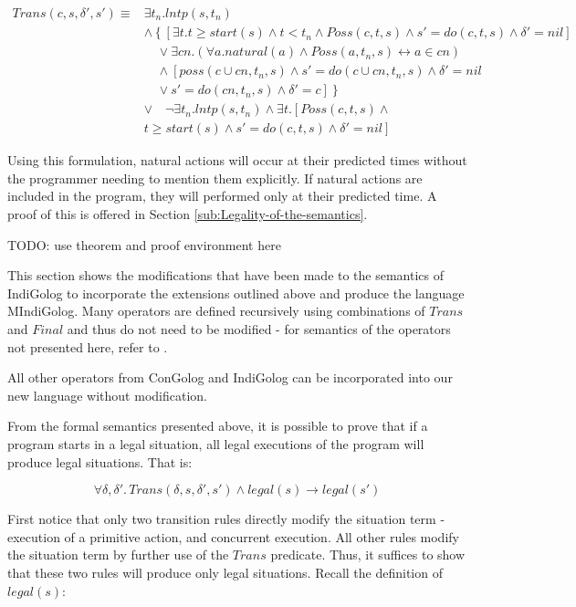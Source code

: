 \documentclass[letterpaper]{article}
\begin{document}
\begin{align*}
Trans(c,s,\delta',s')\equiv & \exists t_{n}. lntp(s,t_{n}) \\
  & \wedge \left\{ \left[\exists t.t\geq start(s)\wedge t<t_{n}\wedge Poss(c,t,s)\wedge s'=do(c,t,s)\wedge\delta'=nil\right]\right.\\
  &  \quad\vee\exists cn.\left(\forall a.natural(a)\wedge Poss(a,t_{n},s)\leftrightarrow a\in cn\right)\\
  & \quad\wedge\left[poss(c\cup cn,t_{n},s)\wedge s'=do(c\cup cn,t_{n},s)\wedge\delta'=nil\right.\\
  & \quad\vee\left.\left.s'=do(cn,t_{n},s)\wedge\delta'=c\right]\right\}\\
  & \vee\quad\neg\exists t_{n}.lntp(s,t_{n})\wedge\exists t.\left[Poss(c,t,s)\wedge\right.\\
  & \left.t\geq start(s)\wedge s'=do(c,t,s)\wedge\delta'=nil\right]
\end{align*}


Using this formulation, natural actions will occur at their predicted
times without the programmer needing to mention them explicitly. If
natural actions are included in the program, they will performed only
at their predicted time. A proof of this is offered in Section \ref{sub:Legality-of-the-semantics}.

TODO: use theorem and proof environment here

This section shows the modifications that have been made to the semantics
of IndiGolog to incorporate the extensions outlined above and produce
the language MIndiGolog. Many operators are defined recursively using
combinations of $Trans$ and $Final$ and thus do not need to be modified
- for semantics of the operators not presented here, refer to \cite{giacomo00congolog,giacomo99indigolog}.

All other operators from ConGolog and IndiGolog can be incorporated
into our new language without modification.

From the formal semantics presented above, it is possible to prove
that if a program starts in a legal situation, all legal executions
of the program will produce legal situations. That is:

\[
\forall\delta,\delta'.\, Trans(\delta,s,\delta',s')\wedge legal(s)\rightarrow legal(s')\]


First notice that only two transition rules directly modify the situation
term - execution of a primitive action, and concurrent execution.
All other rules modify the situation term by further use of the $Trans$
predicate. Thus, it suffices to show that these two rules will produce
only legal situations. Recall the definition of $legal(s)$:
\end{document}
